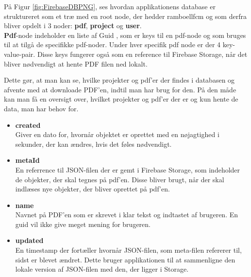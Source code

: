 På Figur \ref{fig:FirebaseDBPNG}, ses hvordan applikationens database er struktureret som et træ med en root node\cite{rootNode}, der hedder ramboellfcm og som derfra bliver opdelt i 3 noder:
\textbf{pdf}, \textbf{project} og \textbf{user}.\\

\textbf{Pdf}-node indeholder en liste af Guid \cite{GUID}, som er keys til en pdf-node og som bruges til at tilgå de specifikke pdf-noder. Under hver specifik pdf node er der 4 key-value-pair\cite{KVP}. Disse keys fungerer også som en reference til Firebase Storage, når det bliver nødvendigt at hente PDF filen ned lokalt.

Dette gør, at man kan se, hvilke projekter og pdf'er der findes i databasen og afvente med at downloade PDF'en, indtil man har brug for den. På den måde kan man få en oversigt over, hvilket projekter og pdf'er der er og kun hente de data, man har behov for. 
\begin{itemize}
	\item \textbf{created}\\
	Giver en dato for, hvornår objektet er oprettet med en nøjagtighed i sekunder, der kan ændres, hvis det føles nødvendigt.\\
	\item \textbf{metaId}\\
	En referrence til JSON-filen der er gemt i Firebase Storage\cite{FirebaseStorage}, som indeholder de objekter, der skal tegnes på pdf'en. Disse bliver brugt, når der skal indlæses nye objekter, der bliver oprettet på pdf'en.\\ 
	
	\item \textbf{name}\\
	Navnet på PDF'en som er skrevet i klar tekst og indtastet af brugeren. En guid vil ikke give meget mening for brugeren.\\
	
	\item \textbf{updated}\\
	En timestamp der fortæller hvornår JSON-filen, som meta-filen refererer til, sidst er blevet ændret. Dette bruger applikationen til at sammenligne den lokale version af JSON-filen med den, der ligger i Storage.   
\end{itemize}

